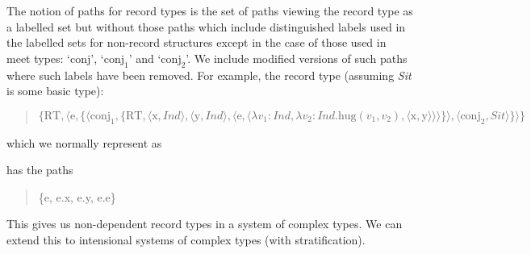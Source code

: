 
The notion of paths for record types is the set of paths viewing the
record type as a labelled set but without those paths which include
distinguished labels used in the labelled sets for non-record
structures except in the case of those used in meet types:
`$\mathrm{conj}$', `$\mathrm{conj}_1$' and `$\mathrm{conj}_2$'.  We
include modified versions of such paths where such labels have been
removed.  For example, the record type (assuming \textit{Sit} is some
basic type):
\begin{quote}
  $\{\text{RT}, \langle\text{e},
  \{\langle\text{conj}_1,
  \{\text{RT}, \langle\text{x},\textit{Ind}\rangle,
  \langle\text{y},\textit{Ind}\rangle,
  \langle\text{e},\langle\lambda v_1\!\!:\!\!\textit{Ind},
  \lambda v_2\!\!:\!\!\textit{Ind} .
  \text{hug}(v_1,v_2),
  \langle\text{x},\text{y}\rangle\rangle\rangle\}\rangle,
  \langle\text{conj}_2,\textit{Sit}\rangle\}\rangle\}$
\end{quote}
which we normally represent as
\begin{quote}
\end{quote}
has the paths
\begin{quote}
  \{e, e.x, e.y, e.e\}
\end{quote}

          
          
  


This gives us non-dependent record types in a system of complex types.
We can extend this to intensional systems of complex types (with
stratification).  


 
